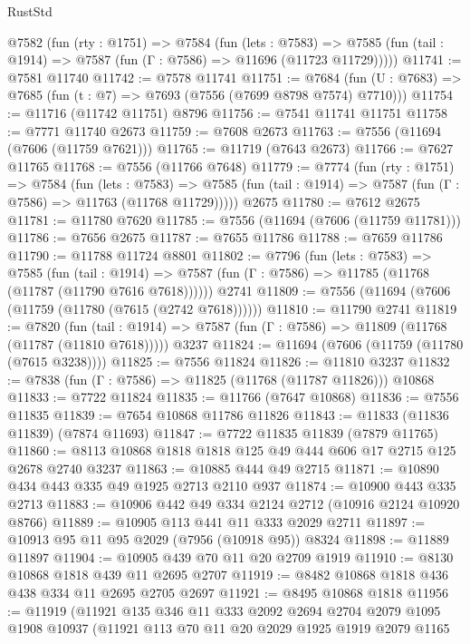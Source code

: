 \begin{lexlean}{RustStd}
\begin{coremodule}
  @7582
    (fun (rty : @1751) =>
    @7584
      (fun (lets : @7583) =>
      @7585 (fun (tail : @1914) => @7587 (fun (Γ : @7586) => @11696 (@11723 @11729)))))
@11741 := @7581 @11740
@11742 := @7578 @11741
@11751 := @7684 (fun (U : @7683) => @7685 (fun (t : @7) => @7693 (@7556 (@7699 @8798 @7574) @7710)))
@11754 := @11716 (@11742 @11751) @8796
@11756 := @7541 @11741 @11751
@11758 := @7771 @11740 @2673
@11759 := @7608 @2673
@11763 := @7556 (@11694 (@7606 (@11759 @7621)))
@11765 := @11719 (@7643 @2673)
@11766 := @7627 @11765
@11768 := @7556 (@11766 @7648)
@11779 := @7774
    (fun (rty : @1751) =>
    @7584
      (fun (lets : @7583) =>
      @7585 (fun (tail : @1914) => @7587 (fun (Γ : @7586) => @11763 (@11768 @11729)))))
    @2675
@11780 := @7612 @2675
@11781 := @11780 @7620
@11785 := @7556 (@11694 (@7606 (@11759 @11781)))
@11786 := @7656 @2675
@11787 := @7655 @11786
@11788 := @7659 @11786
@11790 := @11788 @11724 @8801
@11802 := @7796
    (fun (lets : @7583) =>
    @7585
      (fun (tail : @1914) =>
      @7587 (fun (Γ : @7586) => @11785 (@11768 (@11787 (@11790 @7616 @7618))))))
    @2741
@11809 := @7556 (@11694 (@7606 (@11759 (@11780 (@7615 (@2742 @7618))))))
@11810 := @11790 @2741
@11819 := @7820
    (fun (tail : @1914) => @7587 (fun (Γ : @7586) => @11809 (@11768 (@11787 (@11810 @7618)))))
    @3237
@11824 := @11694 (@7606 (@11759 (@11780 (@7615 @3238))))
@11825 := @7556 @11824
@11826 := @11810 @3237
@11832 := @7838 (fun (Γ : @7586) => @11825 (@11768 (@11787 @11826))) @10868
@11833 := @7722 @11824
@11835 := @11766 (@7647 @10868)
@11836 := @7556 @11835
@11839 := @7654 @10868 @11786 @11826
@11843 := @11833 (@11836 @11839) (@7874 @11693)
@11847 := @7722 @11835 @11839 (@7879 @11765)
@11860 := @8113 @10868 @1818 @1818 @125 @49 @444 @606 @17 @2715 @125 @2678 @2740 @3237
@11863 := @10885 @444 @49 @2715
@11871 := @10890 @434 @443 @335 @49 @1925 @2713 @2110 @937
@11874 := @10900 @443 @335 @2713
@11883 := @10906 @442 @49 @334 @2124 @2712 (@10916 @2124 @10920 @8766)
@11889 := @10905 @113 @441 @11 @333 @2029 @2711
@11897 := @10913 @95 @11 @95 @2029 (@7956 (@10918 @95)) @8324
@11898 := @11889 @11897
@11904 := @10905 @439 @70 @11 @20 @2709 @1919
@11910 := @8130 @10868 @1818 @439 @11 @2695 @2707
@11919 := @8482 @10868 @1818 @436 @438 @334 @11 @2695 @2705 @2697
@11921 := @8495 @10868 @1818
@11956 := @11919
    (@11921
      @135
      @346
      @11
      @333
      @2092
      @2694
      @2704
      @2079
      @1095
      @1908
      @10937
      (@11921
        @113
        @70
        @11
        @20
        @2029
        @1925
        @1919
        @2079
        @1165

\end{coremodule}
\end{lexlean}
